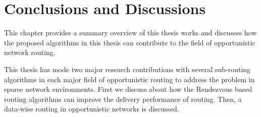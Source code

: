 \chapter{Conclusions and Discussions}
\label{cf}


This chapter provides a summary overview of this thesis works and discusses how the proposed algorithms in this thesis can contribute to the field of opportunistic network routing.


This thesis has mode two major research contributions with several sub-routing algorithms in each major field of opportunistic routing to address the problem in sparse network environments.
First we discuss about how the Rendezvous based routing algorithms can improve the delivery performance of routing.
Then, a data-wise routing in opportunistic networks is discussed.

